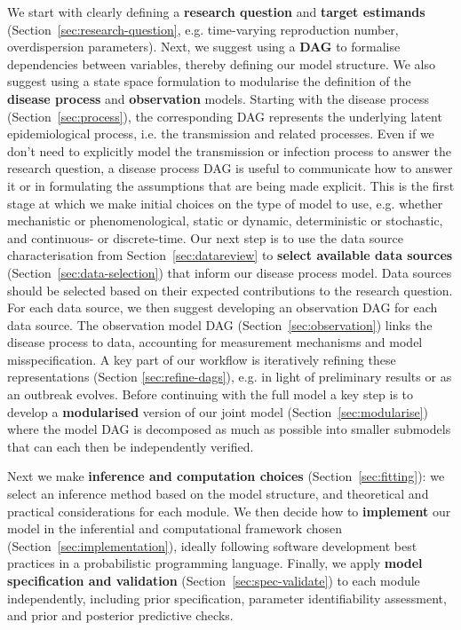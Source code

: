 \documentclass{article}
\begin{document}
We start with clearly defining a \textbf{research question} and \textbf{target estimands} (Section~\ref{sec:research-question}, e.g. time-varying reproduction number, overdispersion parameters). Next, we suggest using a \textbf{\ac{DAG}} to formalise dependencies between variables, thereby defining our model structure. We also suggest using a state space formulation \citep{birrell2018evidence} to modularise the definition of the \textbf{disease process} and \textbf{observation} models. Starting with the disease process (Section~\ref{sec:process}), the corresponding \ac{DAG} represents the underlying latent epidemiological process, i.e. the transmission and related processes. Even if we don't need to explicitly model the transmission or infection process to answer the research question, a disease process \ac{DAG} is useful to communicate how to answer it or in formulating the assumptions that are being made explicit. This is the first stage at which we make initial choices on the type of model to use, e.g. whether mechanistic or phenomenological, static or dynamic, deterministic or stochastic, and continuous- or discrete-time.
Our next step is to use the data source characterisation from Section~\ref{sec:datareview} to \textbf{select available data sources} (Section~\ref{sec:data-selection}) that inform our disease process model. Data sources should be selected based on their expected contributions to the research question. For each data source, we then suggest developing an observation \ac{DAG} for each data source.
The observation model \ac{DAG} (Section~\ref{sec:observation}) links the disease process to data, accounting for measurement mechanisms and model misspecification. A key part of our workflow is iteratively refining these representations (Section \ref{sec:refine-dags}), e.g. in light of preliminary results or as an outbreak evolves. 
Before continuing with the full model a key step is to develop a \textbf{modularised} version of our joint model (Section~\ref{sec:modularise}) where the model \ac{DAG} is decomposed as much as possible into smaller submodels that can each then be independently verified.

Next we make \textbf{inference and computation choices} (Section~\ref{sec:fitting}): we select an inference method based on the model structure, and theoretical and practical considerations for each module.
We then decide how to \textbf{implement} our model in the inferential and computational framework chosen (Section~\ref{sec:implementation}), ideally following software development best practices in a probabilistic programming language.
Finally, we apply \textbf{model specification and validation} (Section~\ref{sec:spec-validate}) to each module independently, including prior specification, parameter identifiability assessment, and prior and posterior predictive checks.
\end{document}

